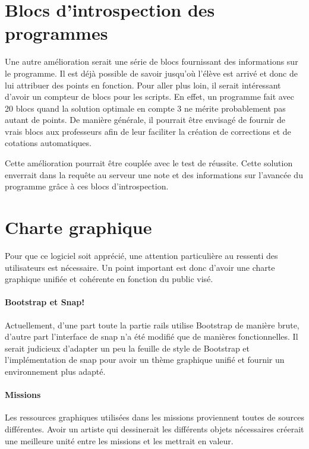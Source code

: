 \section{Blocs d'introspection des programmes}
Une autre amélioration serait une série de \glspl{bloc}  fournissant des informations sur le programme. Il est déjà possible de savoir jusqu'où l'élève est arrivé et donc de lui attribuer des points en fonction.
Pour aller plus loin, il serait intéressant d'avoir un compteur de \glspl{bloc}  pour les \glspl{script}. En effet, un programme fait avec 20 \glspl{bloc}  quand la solution optimale en compte 3 ne mérite probablement pas autant de points.
De manière générale, il pourrait être envisagé de fournir de vrais \glspl{bloc}  aux professeurs afin de leur faciliter la création de corrections et de cotations automatiques.

Cette amélioration pourrait être couplée avec le test de réussite. Cette solution enverrait dans la requête au serveur une note et des informations sur l'avancée du programme grâce à ces \glspl{bloc}  d'introspection.

\section{Charte graphique}
Pour que ce logiciel soit apprécié, une attention particulière au ressenti des utilisateurs est nécessaire. Un point important est donc d'avoir une charte graphique unifiée et cohérente en fonction du public visé.

\paragraph{Bootstrap et Snap!}
Actuellement, d'une part toute la partie \gls{rails} utilise Bootstrap de manière brute, d'autre part l'interface de \gls{snap} n'a été modifié que de manières fonctionnelles. Il serait judicieux d'adapter un peu la feuille de style de Bootstrap et l'implémentation de \gls{snap} pour avoir un thème graphique unifié et fournir un environnement plus adapté.

\paragraph{Missions}
Les ressources graphiques utilisées dans les \glspl{mission} proviennent toutes de sources différentes. Avoir un artiste qui dessinerait les différents objets nécessaires créerait une meilleure unité entre les \glspl{mission} et les mettrait en valeur.

